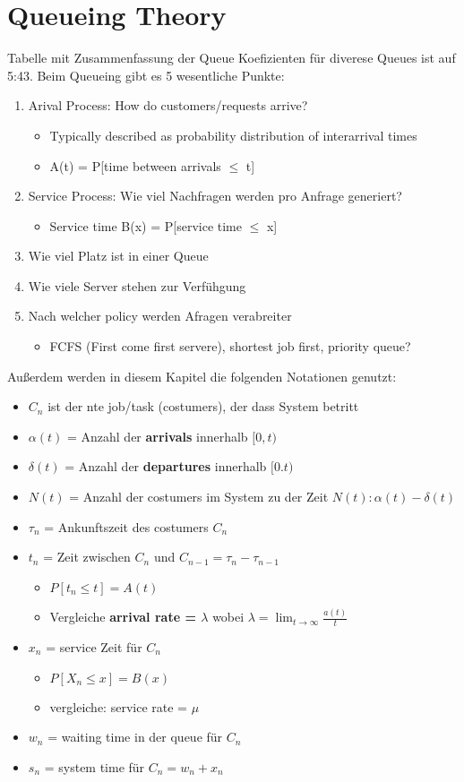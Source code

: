 \section{Queueing Theory}
	Tabelle mit Zusammenfassung der Queue Koefizienten für diverese Queues ist auf 5:43. 
	Beim Queueing gibt es 5 wesentliche Punkte:
	\begin{enumerate}
		\item Arival Process: How do customers/requests arrive?
			\begin{itemize}
				\item Typically described as probability distribution of interarrival times
				\item A(t) = P[time between arrivals $\le$ t]
			\end{itemize}
		\item Service Process: Wie viel Nachfragen werden pro Anfrage generiert?
			\begin{itemize}
				\item Service time B(x) = P[service time $\le$ x]
			\end{itemize}
		\item Wie viel Platz ist in einer Queue
		\item Wie viele Server stehen zur Verfühgung
		\item Nach welcher policy werden Afragen verabreiter
			\begin{itemize}
				\item FCFS (First come first servere), shortest job first, priority queue?
			\end{itemize}
	\end{enumerate}
	Außerdem werden in diesem Kapitel die folgenden Notationen genutzt:
	\begin{itemize}
		\item $C_n$ ist der nte job/task (costumers), der dass System betritt
		\item $\alpha(t)$ = Anzahl der \textbf{arrivals} innerhalb $[0,t)$
		\item $\delta(t)$ = Anzahl der \textbf{departures} innerhalb $[0.t)$
		\item $N(t)$ = Anzahl der costumers im System zu der Zeit $N(t): \alpha(t)-\delta(t)$
		\item $\tau_n$ = Ankunftszeit des costumers $C_n$
		\item $t_n$ = Zeit zwischen $C_n$ und $C_{n-1}=\tau_n-\tau_{n-1}$ 
			\begin{itemize}
				\item $P[t_n\le t] = A(t)$
				\item Vergleiche \textbf{arrival rate = $\lambda$} wobei $\lambda = \lim_{t \to \infty} \frac{a(t)}{t}$
			\end{itemize}
		\item $x_n$ = service Zeit für $C_n$
			\begin{itemize}
				\item $P[X_n \le x] = B(x)$
				\item vergleiche: service rate = $\mu$ 
			\end{itemize}
		\item $w_n$ = waiting time in der queue für $C_n$
		\item $s_n$ = system time für $C_n = w_n + x_n$
	\end{itemize}

